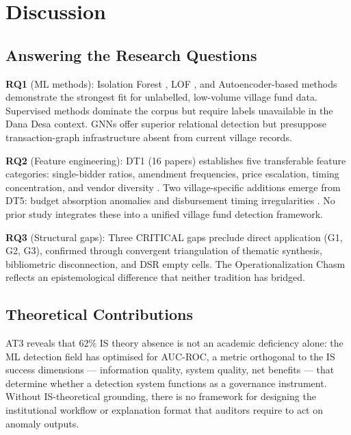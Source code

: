 \documentclass[3p,times,procedia]{elsarticle}
\begin{document}
\section{Discussion}
\label{sec:discussion}

\subsection{Answering the Research Questions}

\textbf{RQ1} (ML methods): Isolation Forest \cite{p015}, LOF \cite{p041}, and Autoencoder-based methods \cite{p003,p015} demonstrate the strongest fit for unlabelled, low-volume village fund data. Supervised methods dominate the corpus \cite{p003,p007,p022,p026,p039} but require labels unavailable in the Dana Desa context. GNNs offer superior relational detection \cite{p014,p045} but presuppose transaction-graph infrastructure absent from current village records.

\textbf{RQ2} (Feature engineering): DT1 (16 papers) establishes five transferable feature categories: single-bidder ratios, amendment frequencies, price escalation, timing concentration, and vendor diversity \cite{p008,p043}. Two village-specific additions emerge from DT5: budget absorption anomalies and disbursement timing irregularities \cite{method_kpk2023}. No prior study integrates these into a unified village fund detection framework.

\textbf{RQ3} (Structural gaps): Three CRITICAL gaps preclude direct application (G1, G2, G3), confirmed through convergent triangulation of thematic synthesis, bibliometric disconnection, and DSR empty cells. The Operationalization Chasm reflects an epistemological difference that neither tradition has bridged.

\subsection{Theoretical Contributions}

AT3 reveals that 62\% IS theory absence is not an academic deficiency alone: the ML detection field has optimised for AUC-ROC, a metric orthogonal to the IS success dimensions --- information quality, system quality, net benefits \cite{method_delone2003} --- that determine whether a detection system functions as a governance instrument. Without IS-theoretical grounding, there is no framework for designing the institutional workflow or explanation format that auditors require to act on anomaly outputs.
\end{document}
